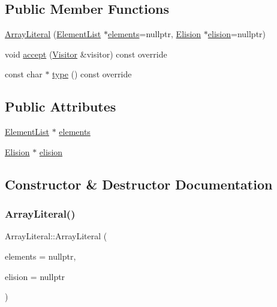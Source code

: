 \subsection*{Public Member Functions}
\begin{DoxyCompactItemize}
\item 
\hyperlink{struct_array_literal_a1df7283ca804e7c1147f5024e2e0408d}{Array\+Literal} (\hyperlink{struct_element_list}{Element\+List} $\ast$\hyperlink{struct_array_literal_ae4c3df364c3994cb8916d73a50f1f92f}{elements}=nullptr, \hyperlink{struct_elision}{Elision} $\ast$\hyperlink{struct_array_literal_a08fa9ad6e83376bb2a70d22df9cf2c8a}{elision}=nullptr)
\item 
void \hyperlink{struct_array_literal_ab3ba06d627e0fe714aafb9fc843c83e8}{accept} (\hyperlink{struct_visitor}{Visitor} \&visitor) const override
\item 
const char $\ast$ \hyperlink{struct_array_literal_a24964c1f68d796d071b830b605046f51}{type} () const override
\end{DoxyCompactItemize}
\subsection*{Public Attributes}
\begin{DoxyCompactItemize}
\item 
\hyperlink{struct_element_list}{Element\+List} $\ast$ \hyperlink{struct_array_literal_ae4c3df364c3994cb8916d73a50f1f92f}{elements}
\item 
\hyperlink{struct_elision}{Elision} $\ast$ \hyperlink{struct_array_literal_a08fa9ad6e83376bb2a70d22df9cf2c8a}{elision}
\end{DoxyCompactItemize}


\subsection{Constructor \& Destructor Documentation}
\mbox{\label{struct_array_literal_a1df7283ca804e7c1147f5024e2e0408d}} 
\subsubsection{\texorpdfstring{Array\+Literal()}{ArrayLiteral()}}
{\footnotesize\ttfamily Array\+Literal\+::\+Array\+Literal (\begin{DoxyParamCaption}\item[{\hyperlink{struct_element_list}{Element\+List} $\ast$}]{elements = {\ttfamily nullptr},  }\item[{\hyperlink{struct_elision}{Elision} $\ast$}]{elision = {\ttfamily nullptr} }\end{DoxyParamCaption})\hspace{0.3cm}{\ttfamily [inline]}}



